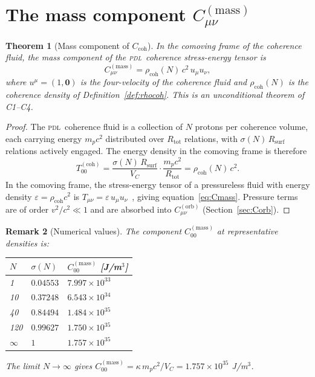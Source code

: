 \documentclass[12pt,a4paper]{article}
\newtheorem{theorem}{Theorem}[section]
\newtheorem{remark}[theorem]{Remark}
\newcommand{\PDL}{\textsc{pdl}}
\newcommand{\Ccoh}{C_{\mathrm{coh}}}
\newcommand{\Cmass}{C^{(\mathrm{mass})}}
\newcommand{\Corb}{C^{(\mathrm{orb})}}
\newcommand{\rhocoh}{\rho_{\mathrm{coh}}}
\newcommand{\sig}{\sigma}
\newcommand{\Rsurf}{R_{\mathrm{surf}}}
\newcommand{\Rtot}{R_{\mathrm{tot}}}
\newcommand{\VC}{V_C}
\begin{document}
\section{The mass component \texorpdfstring{$\Cmass_{\mu\nu}$}{C(mass)}}
\label{sec:Cmass}

\begin{theorem}[Mass component of $\Ccoh$]
\label{thm:Cmass}
In the comoving frame of the coherence fluid, the mass component of the \PDL\ coherence stress-energy tensor is
\begin{equation}
\Cmass_{\mu\nu} = \rhocoh(N)\,c^2\,u_\mu u_\nu,
\label{eq:Cmass}
\end{equation}
where $u^\mu = (1,\mathbf{0})$ is the four-velocity of the coherence fluid and $\rhocoh(N)$ is the coherence density of Definition~\ref{def:rhocoh}. This is an unconditional theorem of C1--C4.
\end{theorem}

\begin{proof}
The \PDL\ coherence fluid is a collection of $N$ protons per coherence volume, each carrying energy $m_p c^2$ distributed over $\Rtot$ relations, with $\sig(N)\,\Rsurf$ relations actively engaged. The energy density in the comoving frame is therefore
\begin{equation}
T_{00}^{(\mathrm{coh})} = \frac{\sig(N)\,\Rsurf}{V_C}\cdot\frac{m_p c^2}{\Rtot} = \rhocoh(N)\,c^2.
\end{equation}
In the comoving frame, the stress-energy tensor of a pressureless fluid with energy density $\varepsilon = \rhocoh c^2$ is $T_{\mu\nu} = \varepsilon\,u_\mu u_\nu$~\cite{Misner_1973}, giving equation~\eqref{eq:Cmass}. Pressure terms are of order $v^2/c^2 \ll 1$ and are absorbed into $\Corb_{\mu\nu}$ (Section~\ref{sec:Corb}).
\end{proof}

\begin{remark}[Numerical values]
\label{rem:Cmass_num}
The component $\Cmass_{00}$ at representative densities is:
\begin{center}
\begin{tabular}{p{1.5cm}p{4cm}p{4cm}}
\toprule
$N$ & $\sig(N)$ & $\Cmass_{00}$ [J/m$^3$] \\
\midrule
1 & $0.04553$ & $7.997\times10^{33}$ \\
10 & $0.37248$ & $6.543\times10^{34}$ \\
40 & $0.84494$ & $1.484\times10^{35}$ \\
120 & $0.99627$ & $1.750\times10^{35}$ \\
$\infty$ & $1$ & $1.757\times10^{35}$ \\
\bottomrule
\end{tabular}
\end{center}
The limit $N\to\infty$ gives $\Cmass_{00} = \kappa\,m_p c^2/\VC = 1.757\times10^{35}$ J/m$^3$.
\end{remark}
\end{document}
